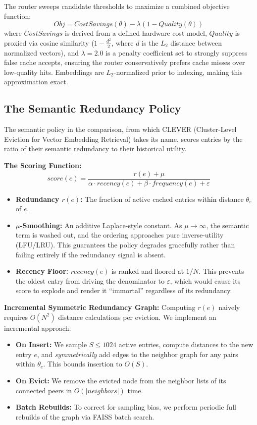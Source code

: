 \documentclass[sigconf,nonacm]{acmart}
\begin{document}
The router sweeps candidate thresholds to maximize a combined objective function:
\begin{equation}
\mathit{Obj} = \mathit{CostSavings}(\theta) - \lambda(1 - \mathit{Quality}(\theta))
\end{equation}
where $\mathit{CostSavings}$ is derived from a defined hardware cost
model, $\mathit{Quality}$ is proxied via cosine similarity
($1 - \frac{d^2}{2}$, where $d$ is the $L_2$ distance
between normalized vectors), and $\lambda = 2.0$ is a
penalty coefficient set to strongly suppress false cache
accepts, ensuring the router conservatively prefers cache
misses over low-quality hits. Embeddings are
$L_2$-normalized prior to indexing, making this
approximation exact.

\subsection{The Semantic Redundancy Policy}
The semantic policy in the comparison, from which CLEVER (Cluster-Level Eviction for Vector Embedding Retrieval) takes its name, scores entries by the ratio of their semantic redundancy to their historical utility.

\textbf{The Scoring Function:}
\begin{equation}
\mathit{score}(e) = \frac{r(e) + \mu}{\alpha \cdot \mathit{recency}(e) + \beta \cdot \mathit{frequency}(e) + \varepsilon}
\end{equation}

\begin{itemize}
\item \textbf{Redundancy $r(e)$:} The fraction of active cached entries within distance $\theta_e$ of $e$.
\item \textbf{$\mu$-Smoothing:} An additive Laplace-style constant. As $\mu \to \infty$, the semantic term is washed out, and the ordering approaches pure inverse-utility (LFU/LRU). This guarantees the policy degrades gracefully rather than failing entirely if the redundancy signal is absent.
\item \textbf{Recency Floor:} $recency(e)$ is ranked and floored at $1/N$. This prevents the oldest entry from driving the denominator to $\varepsilon$, which would cause its score to explode and render it ``immortal'' regardless of its redundancy.
\end{itemize}

\textbf{Incremental Symmetric Redundancy Graph:}
Computing $r(e)$ naively requires $O(N^2)$ distance calculations per eviction. We implement an incremental approach:
\begin{itemize}
\item \textbf{On Insert:} We sample $S \le 1024$ active entries, compute distances to the new entry $e$, and \textit{symmetrically} add edges to the neighbor graph for any pairs within $\theta_e$. This bounds insertion to $O(S)$.
\item \textbf{On Evict:} We remove the evicted node from the neighbor lists of its connected peers in $O(|neighbors|)$ time.
\item \textbf{Batch Rebuilds:} To correct for sampling bias, we perform periodic full rebuilds of the graph via FAISS batch search.
\end{itemize}
\end{document}
